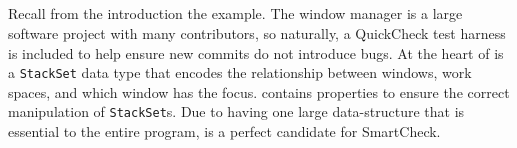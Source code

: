 \documentclass{sigplanconf}
\newenvironment{code}{\begin{alltt}\footnotesize}{\end{alltt}}
\newcommand{\ttp}[1]{\texttt{#1}}
\begin{document}


\subsection{\xmonad}
Recall from the introduction the \xmonad example.  The \xmonad window manager is a
large software project with many contributors, so naturally, a QuickCheck
test harness is included to help ensure new commits do not introduce bugs.  At
the heart of \xmonad is a \ttp{StackSet} data type that encodes the relationship
between windows, work spaces, and which window has the focus.  \xmonad contains
properties to ensure the correct manipulation of \ttp{StackSet}s.  Due to having
one large data-structure that is essential to the entire program, \xmonad is a
perfect candidate for SmartCheck.
\end{document}
